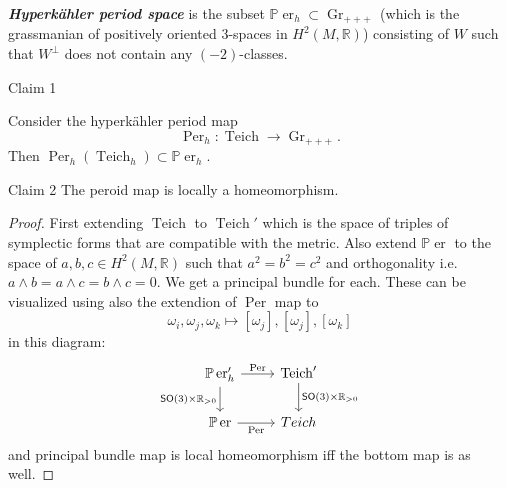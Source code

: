 \begin{defn}\leavevmode
	\textit{\textbf{Hyperkähler period space}} is the subset $\mathbb{P}\operatorname{er}_h \subset \operatorname{Gr}_{+ + +}$ (which is the grassmanian of positively oriented 3-spaces in $H^{2}(M,\mathbb{R})$) consisting of $W$ such that $W^\perp$ does not contain any $(-2)$-classes.
\end{defn}

\begin{thing4}{Claim 1}\leavevmode
	
	Consider the hyperkähler period map
	\[\operatorname{P er}_h:\operatorname{Teich}\longrightarrow \operatorname{Gr}_{+ + +}.\]
	Then $\operatorname{Per}_h(\operatorname{Teich}_h) \subset \mathbb{P}\operatorname{er}_h$.
\end{thing4}


\begin{thing4}{Claim 2}\leavevmode
	The peroid map is locally a homeomorphism.
\end{thing4}

\begin{proof}\leavevmode
First extending $\operatorname{Teich}$ to $\operatorname{Teich}'$ which is the space of triples of symplectic forms that are compatible with the metric. Also extend $\mathbb{P}\operatorname{er}$ to the space of $a,b,c \in H^{2}(M,\mathbb{R})$ such that $a^2=b^2=c^2$ and orthogonality i.e.  $a\wedge b=a \wedge c=b \wedge c=0$. We get a principal bundle for each. These can be visualized using also the extendion of $\operatorname{P er}$ map to
\[\omega_i, \omega_j, \omega_k\longmapsto [\omega_j],[\omega_j],[\omega_k]\]
in this diagram:
\[\begin{tikzcd}
	\mathbb{P}\operatorname{er}'_h\arrow[r,"\operatorname{P er}"]\arrow[d,"\mathsf{SO}(3)\times\mathbb{R}_{>0}",swap]&\operatorname{Teich}'\arrow[d,"\mathsf{SO}(3)\times\mathbb{R}_{>0}"]\\
	\mathbb{P}\operatorname{er}\arrow[r,swap,"\operatorname{P er}"]&Teich 
\end{tikzcd}\]
and principal bundle map is local homeomorphism iff the bottom map is as well.
\end{proof}







































